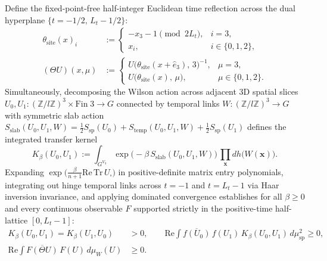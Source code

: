 Define the fixed-point-free half-integer Euclidean time reflection across the dual hyperplane $\{t = -1/2,\, L_t - 1/2\}$:
\begin{align}
\theta_{\mathrm{site}}(x)_i &:= \begin{cases}
  -x_3 - 1 \pmod{2 L_t}, & i = 3,\\
  x_i, & i \in \{0,1,2\},
\end{cases}
\nonumber\\[0.3em]
(\Theta U)(x,\mu) &:= \begin{cases}
  U\bigl(\theta_{\mathrm{site}}(x + \hat{e}_3),\,3\bigr)^{-1}, & \mu = 3,\\
  U\bigl(\theta_{\mathrm{site}}(x),\,\mu\bigr), & \mu \in \{0,1,2\}.
\end{cases}
\label{eq:os_time_reflection_def}
\end{align}
Simultaneously, decomposing the Wilson action across adjacent 3D spatial slices $U_0, U_1 : (\mathbb{Z}/l\mathbb{Z})^3 \times \mathrm{Fin}\;3 \to G$ connected by temporal links $W : (\mathbb{Z}/l\mathbb{Z})^3 \to G$ with symmetric slab action $S_{\mathrm{slab}}(U_0,U_1,W) = \frac{1}{2}S_{\mathrm{sp}}(U_0) + S_{\mathrm{temp}}(U_0,U_1,W) + \frac{1}{2}S_{\mathrm{sp}}(U_1)$ defines the integrated transfer kernel
\begin{equation}
K_\beta(U_0, U_1) := \int_{G^{V_3}} \exp\bigl(-\beta\,S_{\mathrm{slab}}(U_0, U_1, W)\bigr)\,\prod_{\mathbf{x}} dh\bigl(W(\mathbf{x})\bigr).
\label{eq:slab_transfer_kernel}
\end{equation}
Expanding $\exp\bigl(\frac{\beta}{n+1}\mathrm{Re}\,\mathrm{Tr}\,U_\square\bigr)$ in positive-definite matrix entry polynomials, integrating out hinge temporal links across $t = -1$ and $t = L_t - 1$ via Haar inversion invariance, and applying dominated convergence establishes for all $\beta \ge 0$ and every continuous observable $F$ supported strictly in the positive-time half-lattice $[0, L_t - 1]$:
\begin{align}
K_\beta(U_0, U_1) = K_\beta(U_1, U_0) &> 0,
\qquad
\mathrm{Re}\int \overline{f(U_0)}\,f(U_1)\,K_\beta(U_0,U_1)\,d\mu_{\mathrm{sp}}^2 \ge 0,
\nonumber\\
\mathrm{Re}\int \overline{F(\Theta U)}\,F(U)\,d\mu_W(U) &\ge 0.
\label{eq:os_reflection_positivity_ineq}
\end{align}

